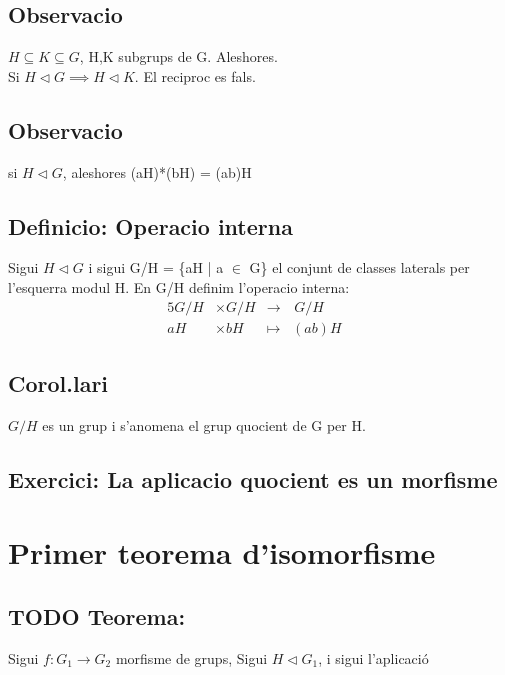 \documentclass[11pt]{article}
\begin{document}
\subsection{Observacio}
\label{sec:org45bdedb}
\(H \subseteq K \subseteq G\), H,K subgrups de G. Aleshores. \\
Si \(H \vartriangleleft G \implies H \vartriangleleft K\). El reciproc es fals.
\subsection{Observacio}
\label{sec:org18f28eb}
si \(H \vartriangleleft G\), aleshores (aH)*(bH) = (ab)H
\subsection{Definicio: Operacio interna}
\label{sec:org650e7ae}
Sigui \(H \vartriangleleft G\) i sigui G/H = \{aH | a \(\in\) G\} el conjunt de classes laterals per l'esquerra modul H. En G/H definim l'operacio interna:
\begin{alignat*}{5}
G/H &\times G/H &\to&\hspace{2pt}  G/H & \\
aH &\times bH &\mapsto&  (ab)H &
\end{alignat*}
\subsection{Corol.lari}
\label{sec:orgc83a52a}
\(G/H\) es un grup i s'anomena el grup quocient de G per H.
\subsection{Exercici: La aplicacio quocient es un morfisme}
\label{sec:org4082f08}

\section{Primer teorema d'isomorfisme}
\label{sec:org244d396}

\subsection{{\bfseries\sffamily TODO} Teorema:}
\label{sec:orgce2857f}
Sigui \(f: G_1 \to G_2\) morfisme de grups, Sigui \(H \vartriangleleft G_1\), i sigui l'aplicació
\end{document}
